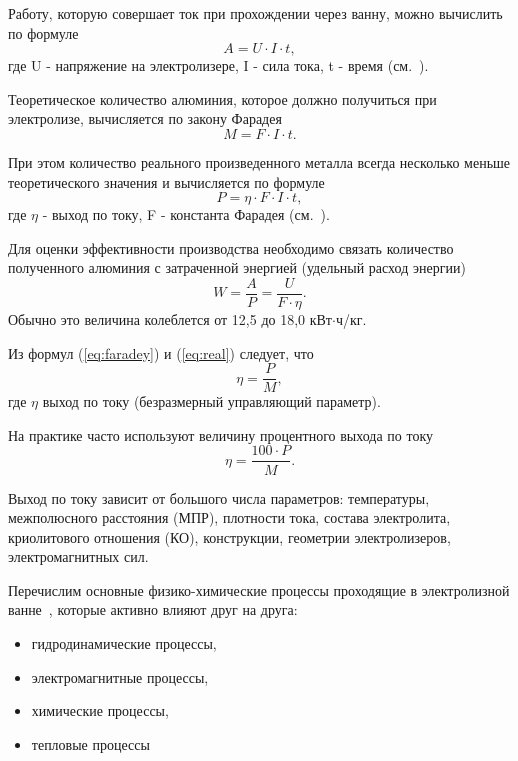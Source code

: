 \documentclass{article}
\begin{document}
Работу, которую совершает ток при прохождении через ванну, можно вычислить по формуле
\begin{equation}
 A=U \cdot I \cdot t,
\end{equation}
где U - напряжение на электролизере, I - сила тока, t - время (см.~\cite{litlink:derkach}).

Теоретическое количество алюминия, которое должно получиться при электролизе, вычисляется по закону Фарадея
\begin{equation}\label{eq:faradey}
M=F \cdot I \cdot t.
\end{equation}

При этом количество реального произведенного металла всегда несколько меньше теоретического значения и вычисляется по формуле 
\begin{equation}\label{eq:real}
P=\eta \cdot F \cdot I \cdot t,
\end{equation}
где $\eta$ - выход по току, F - константа Фарадея (см.~\cite{litlink:derkach}).

Для оценки эффективности производства необходимо связать количество полученного алюминия с затраченной энергией (удельный расход энергии)
\begin{equation}
W=\frac{A}{P}=\frac{U}{F \cdot \eta}.
\end{equation}
Обычно это величина колеблется от 12,5 до 18,0 кВт$\cdot$ч/кг. 

Из формул (\ref{eq:faradey}) и (\ref{eq:real}) следует, что
\begin{equation*}
\eta=\frac{P}{M},
\end{equation*}
где $\eta$ выход по току (безразмерный управляющий параметр).

На практике часто используют величину процентного выхода по току
\begin{equation}
\eta=\frac{100 \cdot P}{M}.
\end{equation}

Выход по току зависит от большого числа параметров: температуры, межполюсного расстояния (МПР), плотности тока, состава электролита, криолитового отношения (КО), конструкции, геометрии электролизеров, электромагнитных сил.

Перечислим основные физико-химические процессы проходящие в электролизной ванне~\cite{litlink:kalmykov}, которые активно влияют друг на друга:
\begin{itemize}
\item гидродинамические процессы,
\item электромагнитные процессы,
\item химические процессы,
\item тепловые процессы
\end{itemize}
\end{document}
